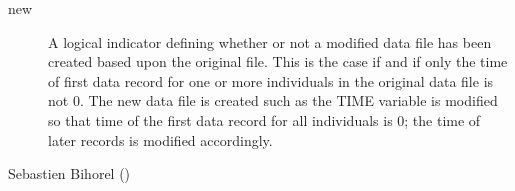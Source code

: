 \begin{Value}
\begin{description}
\begin{description}
\end{description}


\item[new] A logical indicator defining whether or not a modified data file
has been created based upon the original file. This is the case if and 
if only the time of first data record for one or more individuals in the 
original data file is not 0. The new data file is created such as the
TIME variable is modified so that time of the first data record for all 
individuals is 0; the time of later records is modified accordingly.


\end{description}

\end{Value}
%
\begin{Author}\relax
Sebastien Bihorel ()
\end{Author}
%
\begin{SeeAlso}\relax
{}
\end{SeeAlso}

